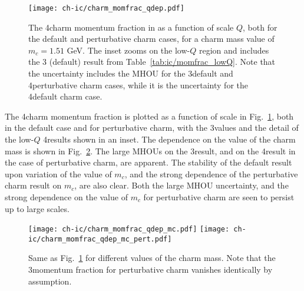 \begin{figure}[h]
  \begin{center}
     \texttt{[image: ch-ic/charm\_momfrac\_qdep.pdf]}
    \caption{\small 
      The 4\fns charm momentum fraction in  as a function of scale $Q$,
      both for the default and perturbative charm cases,
      for a charm mass value of $m_c=1.51$ GeV.
     The inset zooms on the low-$Q$ region and includes the 3\fns
     (default) result
     from Table~\ref{tab:ic/momfrac_lowQ}. 
     Note that the uncertainty includes the MHOU for the 3\fns default
     and 4\fns perturbative charm cases, while it is the \pdf
     uncertainty for the 4\fns default charm case.
  \label{fig:ic/comparison_IC_models} }
\end{center}
\end{figure}

The 4\fns charm momentum fraction is plotted as a function of scale
in Fig.~\ref{fig:ic/comparison_IC_models}, both in the default case and
for perturbative charm, with the 3\fns values and the detail of the low-$Q$ 
4\fns results shown in an inset.
%
The dependence on the value of the charm mass
is shown in Fig.~\ref{fig:ic/charm_momfrac_qdep_mc}.
The large MHOUs on the 3\fns result, and on the 
4\fns result in the case of perturbative charm, are apparent.
The stability of the default result upon variation of  the value of
$m_c$, and the strong dependence of the perturbative charm result on
$m_c$, are  also clear.
Both the large MHOU uncertainty, and the strong dependence on
the value of $m_c$
for perturbative charm are seen to persist up to large scales.


\begin{figure}[t]
  \begin{center}
    \texttt{[image: ch-ic/charm\_momfrac\_qdep\_mc.pdf]}
    \texttt{[image: ch-ic/charm\_momfrac\_qdep\_mc\_pert.pdf]}
    \caption{\small
    Same as Fig.~\ref{fig:ic/comparison_IC_models} for different values
    of the charm mass. Note that the 3\fns momentum fraction for
     perturbative charm vanishes identically by assumption.
   \label{fig:ic/charm_momfrac_qdep_mc} }
\end{center}
\end{figure}

